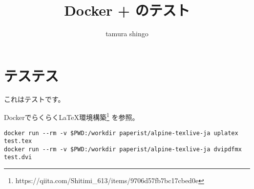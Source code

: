 \documentclass[uplatex]{jsarticle}
\begin{document}
\title{Docker + \pLaTeX のテスト}
\author{tamura shingo}

\maketitle

\section{テステス}

これはテストです。


DockerでらくらくLaTeX環境構築\footnote{https://qiita.com/Shitimi\_613/items/9706d57fb7bc17cbed0e}
を参照。


\begin{verbatim}
docker run --rm -v $PWD:/workdir paperist/alpine-texlive-ja uplatex test.tex
docker run --rm -v $PWD:/workdir paperist/alpine-texlive-ja dvipdfmx test.dvi
\end{verbatim}
\end{document}
